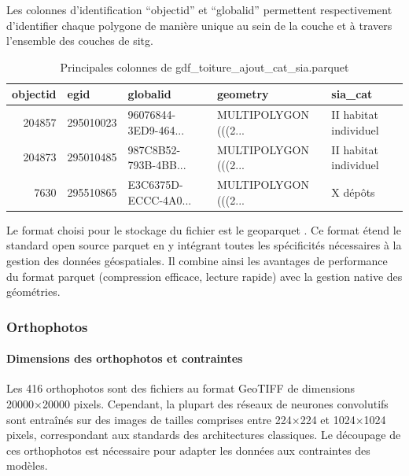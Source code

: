 Les colonnes d'identification ``objectid'' et ``globalid'' permettent respectivement d'identifier chaque polygone de manière unique au sein de la couche et à travers l'ensemble des couches de \acrshort{sitg}.

\begin{table}[H]
\renewcommand{\arraystretch}{2}
\begin{tabular}{@{}rlp{3cm}p{3cm}l@{}}
\toprule
objectid & egid & globalid & geometry & sia\_cat \\
\midrule
204857 & 295010023 & \parbox{3cm}{96076844-3ED9-464...} & \parbox{3cm}{MULTIPOLYGON (((2...} & II habitat individuel \\
204873 & 295010485 & \parbox{3cm}{987C8B52-793B-4BB...} & \parbox{3cm}{MULTIPOLYGON (((2...} & II habitat individuel \\
7630 & 295510865 & \parbox{3cm}{E3C6375D-ECCC-4A0...} & \parbox{3cm}{MULTIPOLYGON (((2...} & X dépôts \\
\bottomrule
\end{tabular}
\caption{Principales colonnes de gdf\_toiture\_ajout\_cat\_sia.parquet}
\label{tab:gdf_toiture_ajout_cat_sia_parquet_head}
\end{table}

Le format choisi pour le stockage du fichier est le geoparquet \cite{noauthor_geoparquet_nodate}. Ce format étend le standard open source parquet \cite{noauthor_parquet_nodate} en y intégrant toutes les spécificités nécessaires à la gestion des données géospatiales. Il combine ainsi les avantages de performance du format parquet (compression efficace, lecture rapide) avec la gestion native des géométries.

\newpage
\subsubsection{Orthophotos}
\paragraph{Dimensions des orthophotos et contraintes}
Les 416 orthophotos sont des fichiers au format GeoTIFF de dimensions 20000×20000 pixels. Cependant, la plupart des réseaux de neurones convolutifs sont entraînés sur des images de tailles comprises entre 224×224 et 1024×1024 pixels, correspondant aux standards des architectures classiques. Le découpage de ces orthophotos est nécessaire pour adapter les données aux contraintes des modèles.

